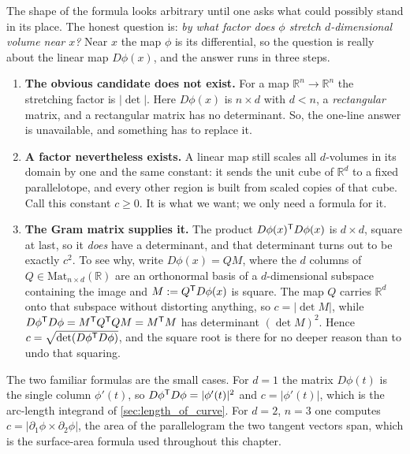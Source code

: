 \begin{remark}
\label{rem:why_gram_determinant}
The shape of the formula looks arbitrary until one asks what could possibly stand in its place.
The honest question is: \emph{by what factor does $\phi$ stretch $d$-dimensional volume near
$x$?} Near $x$ the map $\phi$ is its differential, so the question is really about the linear
map $D\phi(x)$, and the answer runs in three steps.
\begin{enumerate}[label=\textbf{(\alph*)}]
  \item \textbf{The obvious candidate does not exist.} For a map $\mathbb{R}^n \to \mathbb{R}^n$
    the stretching factor is $\lvert\det\rvert$. Here $D\phi(x)$ is $n \times d$ with $d < n$, a
    \emph{rectangular} matrix, and a rectangular matrix has no determinant. So, the one-line
    answer is unavailable, and something has to replace it.
  \item \textbf{A factor nevertheless exists.} A linear map still scales all $d$-volumes in its
    domain by one and the same constant: it sends the unit cube of $\mathbb{R}^d$ to a fixed
    parallelotope, and every other region is built from scaled copies of that cube. Call this
    constant $c \geq 0$. It is what we want; we only need a formula for it.
  \item \textbf{The Gram matrix supplies it.} The product $D\phi(x)^{\mathsf{T}} D\phi(x)$ is
    $d \times d$, square at last, so it \emph{does} have a determinant, and that
    determinant turns out to be exactly $c^2$. To see why, write $D\phi(x) = QM$, where the $d$
    columns of $Q \in \mathrm{Mat}_{n\times d}(\mathbb{R})$ are an orthonormal basis of a
    $d$-dimensional subspace containing the image and $M := Q^{\mathsf{T}} D\phi(x)$ is square. The map
    $Q$ carries $\mathbb{R}^d$ onto that subspace without distorting anything, so $c =
    \lvert\det M\rvert$, while $D\phi^{\mathsf{T}} D\phi = M^{\mathsf{T}} Q^{\mathsf{T}} QM = M^{\mathsf{T}} M$ has
    determinant $(\det M)^2$. Hence $c = \sqrt{\det(D\phi^{\mathsf{T}} D\phi)}$, and the square root is
    there for no deeper reason than to undo that squaring.
\end{enumerate}
The two familiar formulas are the small cases. For $d=1$ the matrix $D\phi(t)$ is the single
column $\phi'(t)$, so $D\phi^{\mathsf{T}} D\phi = \lvert\phi'(t)\rvert^2$ and $c = \lvert\phi'(t)\rvert$,
which is the arc-length integrand of \cref{sec:length_of_curve}. For $d=2$, $n=3$ one computes
$c = \lvert\partial_1\phi \times \partial_2\phi\rvert$, the area of the parallelogram the two
tangent vectors span, which is the surface-area formula used throughout this chapter.
\end{remark}

